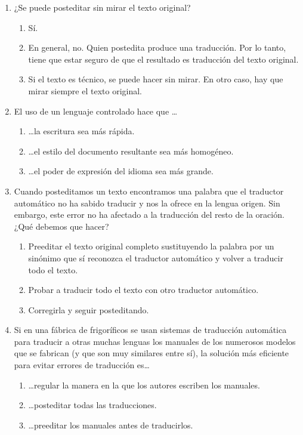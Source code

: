 \begin{enumerate}
\item ¿Se puede posteditar sin mirar el texto original? \begin{enumerate} \item Sí. \item En general, no. Quien postedita produce una traducción. Por lo tanto, tiene que estar seguro de que el resultado es traducción del texto original. \item Si el texto es técnico, se puede hacer sin mirar. En otro caso, hay que mirar siempre el texto original. \end{enumerate} 

\item El uso de un lenguaje controlado hace que \ldots\begin{enumerate} \item \ldots la escritura sea más rápida. \item \ldots el estilo del documento resultante sea más homogéneo. \item \ldots el poder de expresión del idioma sea más grande. \end{enumerate} 

\item Cuando posteditamos un texto encontramos una palabra que el traductor automático no ha sabido traducir y nos la ofrece en la lengua origen. Sin embargo, este error no ha afectado a la traducción del resto de la oración. ¿Qué debemos que hacer? \begin{enumerate} \item Preeditar el texto original completo sustituyendo la palabra por un sinónimo que sí reconozca el traductor automático y volver a traducir todo el texto. \item Probar a traducir todo el texto con otro traductor automático. \item Corregirla y seguir posteditando. \end{enumerate} 

\item Si en una fábrica de frigoríficos se usan sistemas de traducción automática para traducir a otras muchas lenguas los manuales de los numerosos modelos que se fabrican (y que son muy similares entre sí), la solución más eficiente para evitar errores de traducción es{\ldots} \begin{enumerate} \item \ldots regular la manera en la que los autores escriben los manuales. \item \ldots posteditar todas las traducciones. \item \ldots preeditar los manuales antes de traducirlos. \end{enumerate} 


\end{enumerate}
